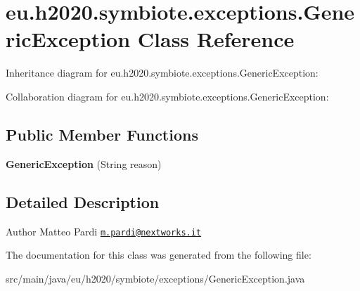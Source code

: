 \hypertarget{classeu_1_1h2020_1_1symbiote_1_1exceptions_1_1GenericException}{}\section{eu.\+h2020.\+symbiote.\+exceptions.\+Generic\+Exception Class Reference}
\label{classeu_1_1h2020_1_1symbiote_1_1exceptions_1_1GenericException}


Inheritance diagram for eu.\+h2020.\+symbiote.\+exceptions.\+Generic\+Exception\+:


Collaboration diagram for eu.\+h2020.\+symbiote.\+exceptions.\+Generic\+Exception\+:
\subsection*{Public Member Functions}
\begin{DoxyCompactItemize}
\item 
\mbox{\label{classeu_1_1h2020_1_1symbiote_1_1exceptions_1_1GenericException_a67dfafcdcbb0d079dbd2544eec79b08c}} 
{\bfseries Generic\+Exception} (String reason)
\end{DoxyCompactItemize}


\subsection{Detailed Description}
\begin{DoxyAuthor}{Author}
Matteo Pardi \href{mailto:m.pardi@nextworks.it}{\tt m.\+pardi@nextworks.\+it} 
\end{DoxyAuthor}


The documentation for this class was generated from the following file\+:\begin{DoxyCompactItemize}
\item 
src/main/java/eu/h2020/symbiote/exceptions/Generic\+Exception.\+java\end{DoxyCompactItemize}
